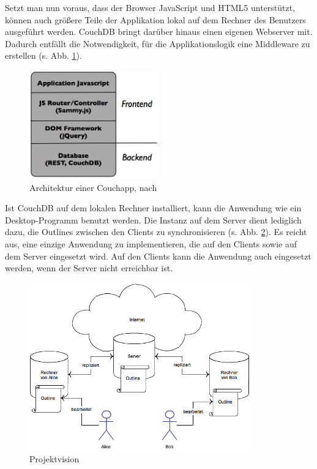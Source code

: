 Setzt man nun voraus, dass der Browser JavaScript und HTML5 unterstützt, können auch größere Teile der Applikation lokal auf dem Rechner des Benutzers ausgeführt werden. CouchDB bringt darüber hinaus einen eigenen Webserver mit. Dadurch entfällt die Notwendigkeit, für die Applikationslogik eine Middleware zu erstellen (s. Abb. \ref{fig:new-web-arch}).

\medskip
\begin{figure}[ht] 
  \begin{center}
    \includegraphics[width=0.5\textwidth]{grafik/new-application-architecture} 
  \end{center}
\caption{Architektur einer Couchapp, nach \cite{web:architecture}}
\label{fig:new-web-arch} 
\end{figure}

\afterpage{\clearpage}

Ist CouchDB auf dem lokalen Rechner installiert, kann die Anwendung wie ein Desktop-Programm benutzt werden. Die Instanz auf dem Server dient lediglich dazu, die Outlines zwischen den Clients zu synchronisieren (s. Abb.
\ref{fig:projektvision}). Es reicht aus, eine einzige Anwendung zu implementieren, die auf den Clients sowie auf dem Server eingesetzt wird. Auf den Clients kann die Anwendung auch eingesetzt werden, wenn der Server nicht erreichbar ist.

\medskip
\begin{figure}[H] 
  \begin{center}
    \includegraphics[width=0.85\textwidth]{grafik/Projektvision} 
  \end{center}
  \caption{Projektvision}
  \label{fig:projektvision} 
\end{figure}


